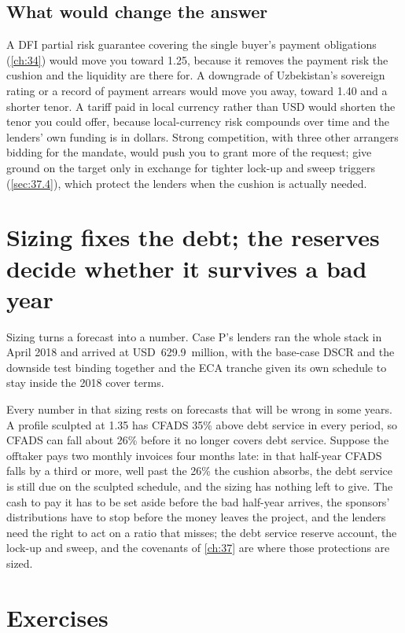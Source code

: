 \subsection*{What would change the answer}
A DFI partial risk guarantee covering the single buyer's payment obligations (\cref{ch:34}) would move you toward 1.25\x, because it removes the payment risk the cushion and the liquidity are there for. A downgrade of Uzbekistan's sovereign rating or a record of payment arrears would move you away, toward 1.40\x{} and a shorter tenor. A tariff paid in local currency rather than USD would shorten the tenor you could offer, because local-currency risk compounds over time and the lenders' own funding is in dollars. Strong competition, with three other arrangers bidding for the mandate, would push you to grant more of the request; give ground on the target only in exchange for tighter lock-up and sweep triggers (\cref{sec:37.4}), which protect the lenders when the cushion is actually needed.

\section{Sizing fixes the debt; the reserves decide whether it survives a bad year}\label{sec:36.15}

Sizing turns a forecast into a number. Case P's lenders ran the whole stack in April 2018 and arrived at USD~629.9~million, with the base-case DSCR and the downside test binding together and the ECA tranche given its own schedule to stay inside the 2018 cover terms.

Every number in that sizing rests on forecasts that will be wrong in some years. A profile sculpted at 1.35\x{} has CFADS 35\% above debt service in every period, so CFADS can fall about 26\% before it no longer covers debt service. Suppose the offtaker pays two monthly invoices four months late: in that half-year CFADS falls by a third or more, well past the 26\% the cushion absorbs, the debt service is still due on the sculpted schedule, and the sizing has nothing left to give. The cash to pay it has to be set aside before the bad half-year arrives, the sponsors' distributions have to stop before the money leaves the project, and the lenders need the right to act on a ratio that misses; the debt service reserve account, the lock-up and sweep, and the covenants of \cref{ch:37} are where those protections are sized.

\section{Exercises}\label{sec:36.16}


